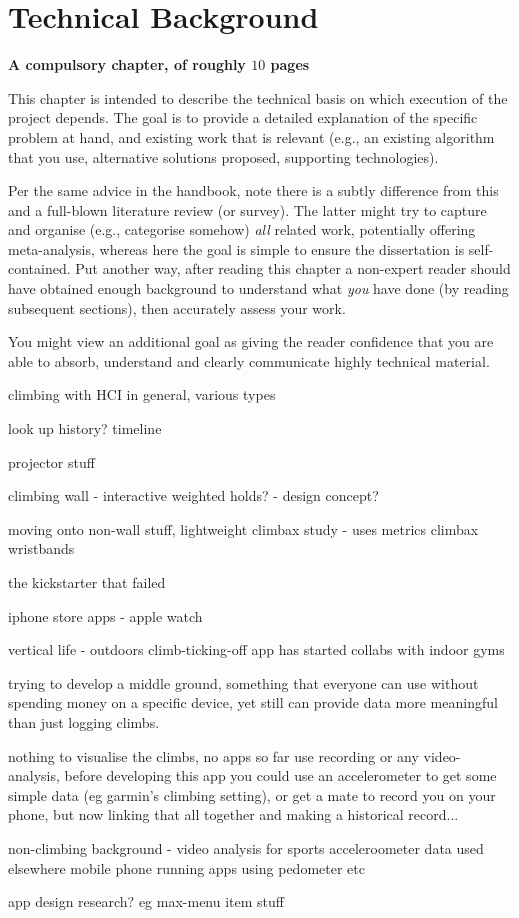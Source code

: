 \chapter{Technical Background}
\label{chap:technical}

{\bf A compulsory chapter,     of roughly $10$ pages}
\vspace{1cm}

\noindent
This chapter is intended to describe the technical basis on which execution
of the project depends.  The goal is to provide a detailed explanation of
the specific problem at hand, and existing work that is relevant (e.g., an
existing algorithm that you use, alternative solutions proposed, supporting
technologies).

Per the same advice in the handbook, note there is a subtly difference from
this and a full-blown literature review (or survey).  The latter might try
to capture and organise (e.g., categorise somehow) {\em all} related work,
potentially offering meta-analysis, whereas here the goal is simple to
ensure the dissertation is self-contained.  Put another way, after reading
this chapter a non-expert reader should have obtained enough background to
understand what {\em you} have done (by reading subsequent sections), then
accurately assess your work.

You might view an additional goal as giving the reader confidence that you are able to absorb, understand and clearly
communicate highly technical material.



climbing with HCI in general, various types

look up history? timeline

projector stuff

climbing wall - interactive weighted holds? - design concept?


moving onto non-wall stuff, lightweight
climbax study - uses metrics
climbax wristbands

the kickstarter that failed

iphone store apps - apple watch

vertical life - outdoors climb-ticking-off app has started collabs with indoor gyms



trying to develop a middle ground, something that everyone can use without spending money on a specific device, yet still can provide data more meaningful than just logging climbs.

nothing to visualise the climbs, no apps so far use recording or any video-analysis, before developing this app you could use an accelerometer to get some simple data (eg garmin's climbing setting), or get a mate to record you on your phone, but now linking that all together and making a historical record...






non-climbing background
- video analysis for sports
acceleroometer data used elsewhere
mobile phone running apps using pedometer etc



app design research?
eg max-menu item stuff
